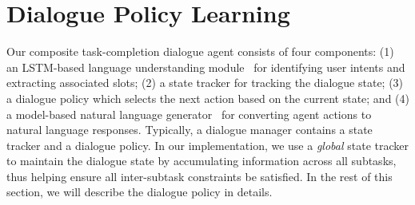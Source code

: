 \documentclass[11pt,letterpaper]{article}
\begin{document}

\section{Dialogue Policy Learning}
Our composite task-completion dialogue agent consists of four components: (1) an LSTM-based language understanding module~\cite{hakkani2016multi, DBLP:conf/slt/YaoPZYZS14} for identifying user intents and extracting associated slots; (2) a state tracker for tracking the dialogue state; (3) a dialogue policy which selects the next action based on the current state; and (4) a model-based natural language generator~\cite{DBLP:conf/emnlp/WenGMSVY15} for converting agent actions to natural language responses. Typically, a dialogue manager contains a state tracker and a dialogue policy. In our implementation, we use a \emph{global} state tracker to maintain the dialogue state by accumulating information across all subtasks, thus helping ensure all inter-subtask constraints be satisfied. In the rest of this section, we will describe the dialogue policy in details.

\end{document}
